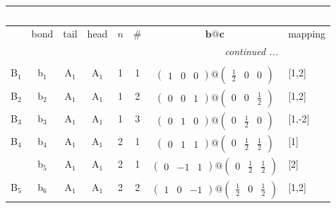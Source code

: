 \documentclass[fleqn,10pt,landscape]{article}
\begin{document}
\begin{itemize}
\begin{center}
\begin{longtable}{cc|cc|c|c|c|l}
\multicolumn{7}{l}{\tablename\ \thetable{}} \\
 \hline \hline
 & bond & tail & head & $n$ & \# & $\bm{b}@\bm{c}$ & mapping \\ \hline \endhead

 \hline \hline
\multicolumn{7}{r}{\footnotesize\it continued ...} \\ \endfoot

 \hline \hline
\multicolumn{7}{r}{} \\ \endlastfoot

B$_{1}$ & b$_{1}$ & A$_{1}$ & A$_{1}$ & 1 & 1 & $\begin{pmatrix} 1 & 0 & 0 \end{pmatrix}@\begin{pmatrix} \frac{1}{2} & 0 & 0 \end{pmatrix}$ & [1,2] \\ \hline
B$_{2}$ & b$_{2}$ & A$_{1}$ & A$_{1}$ & 1 & 2 & $\begin{pmatrix} 0 & 0 & 1 \end{pmatrix}@\begin{pmatrix} 0 & 0 & \frac{1}{2} \end{pmatrix}$ & [1,2] \\ \hline
B$_{3}$ & b$_{3}$ & A$_{1}$ & A$_{1}$ & 1 & 3 & $\begin{pmatrix} 0 & 1 & 0 \end{pmatrix}@\begin{pmatrix} 0 & \frac{1}{2} & 0 \end{pmatrix}$ & [1,-2] \\ \hline
B$_{4}$ & b$_{4}$ & A$_{1}$ & A$_{1}$ & 2 & 1 & $\begin{pmatrix} 0 & 1 & 1 \end{pmatrix}@\begin{pmatrix} 0 & \frac{1}{2} & \frac{1}{2} \end{pmatrix}$ & [1] \\
& b$_{5}$ & A$_{1}$ & A$_{1}$ & 2 & 1 & $\begin{pmatrix} 0 & -1 & 1 \end{pmatrix}@\begin{pmatrix} 0 & \frac{1}{2} & \frac{1}{2} \end{pmatrix}$ & [2] \\ \hline
B$_{5}$ & b$_{6}$ & A$_{1}$ & A$_{1}$ & 2 & 2 & $\begin{pmatrix} 1 & 0 & -1 \end{pmatrix}@\begin{pmatrix} \frac{1}{2} & 0 & \frac{1}{2} \end{pmatrix}$ & [1,2] \\ \hline

\end{longtable}
\end{center}
\end{itemize}
\end{document}
